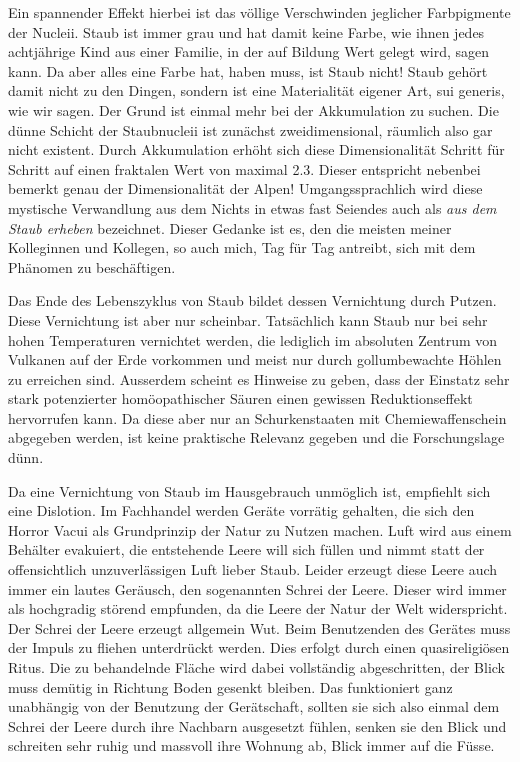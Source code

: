 Ein spannender Effekt hierbei ist das völlige Verschwinden jeglicher Farbpigmente der Nucleii. Staub ist immer grau und hat damit keine Farbe, wie ihnen jedes achtjährige Kind aus einer Familie, in der auf Bildung Wert gelegt wird, sagen kann. Da aber alles eine Farbe hat, haben muss, ist Staub nicht! Staub gehört damit nicht zu den Dingen, sondern ist eine Materialität eigener Art, sui generis, wie wir sagen. Der Grund ist einmal mehr bei der Akkumulation zu suchen. Die dünne Schicht der Staubnucleii ist zunächst zweidimensional, räumlich also gar nicht existent. Durch Akkumulation erhöht sich diese Dimensionalität Schritt für Schritt auf einen fraktalen Wert von maximal 2.3. Dieser entspricht nebenbei bemerkt genau der Dimensionalität der Alpen! Umgangssprachlich wird diese mystische Verwandlung aus dem Nichts in etwas fast Seiendes auch als \textit{aus dem Staub erheben} bezeichnet. Dieser Gedanke ist es, den die meisten meiner Kolleginnen und Kollegen, so auch mich, Tag für Tag antreibt, sich mit dem Phänomen zu beschäftigen.

Das Ende des Lebenszyklus von Staub bildet dessen Vernichtung durch Putzen. Diese Vernichtung ist aber nur scheinbar. Tatsächlich kann Staub nur bei sehr hohen Temperaturen vernichtet werden, die lediglich im absoluten Zentrum von Vulkanen auf der Erde vorkommen und meist nur durch gollumbewachte Höhlen zu erreichen sind. Ausserdem scheint es Hinweise zu geben, dass der Einstatz sehr stark potenzierter homöopathischer Säuren einen gewissen Reduktionseffekt hervorrufen kann. Da diese aber nur an Schurkenstaaten mit Chemiewaffenschein abgegeben werden, ist keine praktische Relevanz gegeben und die Forschungslage dünn.

Da eine Vernichtung von Staub im Hausgebrauch unmöglich ist, empfiehlt sich eine Dislotion. Im Fachhandel werden Geräte vorrätig gehalten, die sich den Horror Vacui als Grundprinzip der Natur zu Nutzen machen. Luft wird aus einem Behälter evakuiert, die entstehende Leere will sich füllen und nimmt statt der offensichtlich unzuverlässigen Luft lieber Staub. Leider erzeugt diese Leere auch immer ein lautes Geräusch, den sogenannten Schrei der Leere. Dieser wird immer als hochgradig störend empfunden, da die Leere der Natur der Welt widerspricht. Der Schrei der Leere erzeugt allgemein Wut. Beim Benutzenden des Gerätes muss der Impuls zu fliehen unterdrückt werden. Dies erfolgt durch einen quasireligiösen Ritus. Die zu behandelnde Fläche wird dabei vollständig abgeschritten, der Blick muss demütig in Richtung Boden gesenkt bleiben. Das funktioniert ganz unabhängig von der Benutzung der Gerätschaft, sollten sie sich also einmal dem Schrei der Leere durch ihre Nachbarn ausgesetzt fühlen, senken sie den Blick und schreiten sehr ruhig und massvoll ihre Wohnung ab, Blick immer auf die Füsse.

